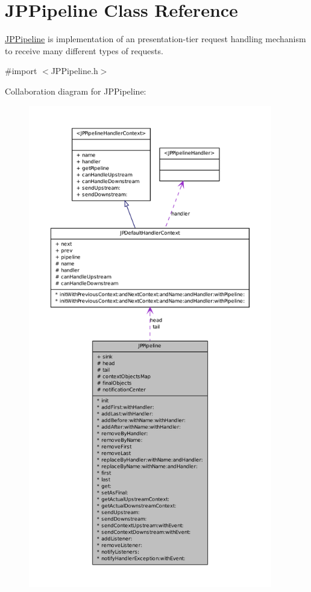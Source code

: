 \hypertarget{a00019}{
\section{JPPipeline Class Reference}
\label{a00019}
}


\hyperlink{a00019}{JPPipeline} is implementation of an presentation-\/tier request handling mechanism to receive many different types of requests.  




{\ttfamily \#import $<$JPPipeline.h$>$}



Collaboration diagram for JPPipeline:\nopagebreak
\begin{figure}[H]
\begin{center}
\leavevmode
\includegraphics[height=600pt]{a00118}
\end{center}
\end{figure}
